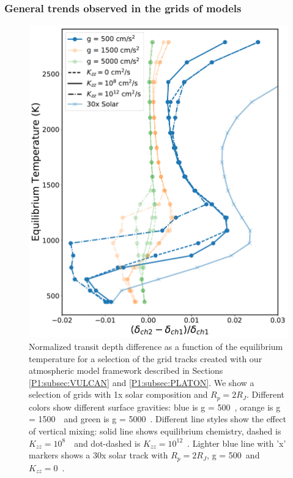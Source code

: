\subsubsection{General trends observed in the grids of models}

\begin{figure}
    \centering
    \includegraphics[width=\linewidth]{gridtracks.pdf}
    \caption{Normalized \spitzer transit depth difference as a function of the equilibrium temperature for a selection of the grid tracks created with our atmospheric model framework described in Sections \ref{P1:subsec:VULCAN} and \ref{P1:subsec:PLATON}. We show a selection of grids with 1x solar composition and $R_p = 2R_J$. Different colors show different surface gravities: blue is g = 500~\cmss, orange is g = 1500~\cmss~and green is g = 5000~\cmss. Different line styles show the effect of vertical mixing: solid line shows equilibrium chemistry, dashed is $K_{zz}=10^8$~\cmcms~and dot-dashed is $K_{zz}=10^{12}$~\cmcms. Lighter blue line with 'x' markers shows a 30x solar track with $R_p = 2R_J$, g = 500~\cmss and $K_{zz}=0$~\cmcms.}
    \label{P1:fig:tracks}
\end{figure}

